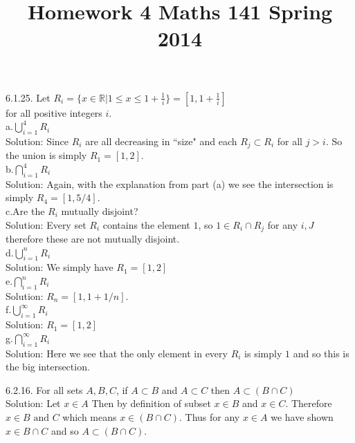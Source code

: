 \documentclass[10 pt]{amsart}
\theoremstyle{definition}
\theoremstyle{remark}
\numberwithin{equation}{subsection}
\newcommand{\R}{\mathbb{R}}
\begin{document}
\title{Homework 4 Maths 141 Spring 2014}
\maketitle 

6.1.25. Let $R_i = \{x\in\R | 1\leq x \leq 1+ \frac{1}{i}\} = [1,1+\frac{1}{i}]$\\ for all positive integers $i$.\\
a.$\bigcup_{i=1}^{4} R_i$\\
Solution: Since $R_i$ are all decreasing in ``size" and each $R_{j}\subset R_i$ for all $j>i$.  So the union is simply $R_1=[1,2]$.\\

b.$\bigcap_{i=1}^{4} R_i$\\

Solution: Again, with the explanation from part (a) we see the intersection is simply $R_4 = [1,5/4]$.\\

c.Are the $R_i$ mutually disjoint?\\

Solution: Every set $R_i$ contains the element $1$, so $1\in R_i\cap R_j$ for any $i,J$ therefore these are not mutually disjoint.\\

d.$\bigcup_{i=1}^{n} R_i$\\

Solution: We simply have $R_1 = [1,2]$\\

e.$\bigcap_{i=1}^{n} R_i$\\

Solution: $R_n = [1,1+1/n]$.\\


f.$\bigcup_{i=1}^{\infty} R_i$\\

Solution: $R_1 = [1,2]$\\

g.$\bigcap_{i=1}^{\infty} R_i$\\
 
Solution: Here we see that the only element in every $R_i$ is simply $1$ and so this is the big intersection. 




\newpage

6.2.16. For all sets $A,B,C$, if $A\subset B$ and $A\subset C$ then $A\subset  (B \cap C)$\\

Solution: Let $x\in A$  Then by definition of subset $x\in B$ and $x\in C$.  Therefore $x \in B \text{ and } C$ which means $x\in (B\cap C)$.  Thus for any $x\in A$ we have shown $x\in B\cap C$ and so $A\subset (B\cap C)$.
\end{document}
